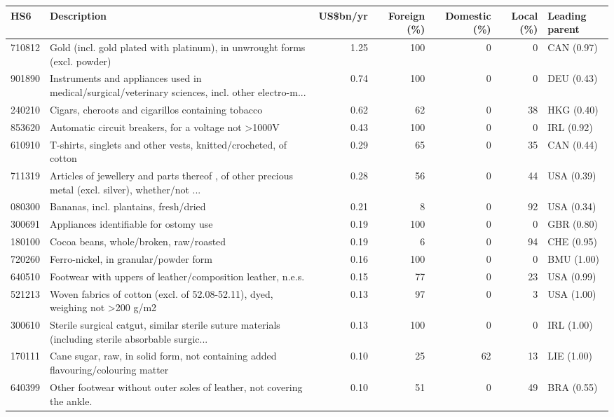 \begin{tabular}{@{}l p{6.4cm} r r r r l@{}}
\toprule
HS6 & Description & US\$bn/yr & Foreign (\%) & Domestic (\%) & Local (\%) & Leading parent \\
\midrule
710812 & Gold (incl. gold plated with platinum), in unwrought forms (excl. powder) & 1.25 & 100 & 0 & 0 & CAN (0.97) \\
901890 & Instruments and appliances used in medical/\allowbreak{}surgical/\allowbreak{}veterinary sciences, incl. other electro-m... & 0.74 & 100 & 0 & 0 & DEU (0.43) \\
240210 & Cigars, cheroots and cigarillos containing tobacco & 0.62 & 62 & 0 & 38 & HKG (0.40) \\
853620 & Automatic circuit breakers, for a voltage not >1000V & 0.43 & 100 & 0 & 0 & IRL (0.92) \\
610910 & T-shirts, singlets and other vests, knitted/\allowbreak{}crocheted, of cotton & 0.29 & 65 & 0 & 35 & CAN (0.44) \\
711319 & Articles of jewellery and parts thereof , of other precious metal (excl. silver), whether/\allowbreak{}not ... & 0.28 & 56 & 0 & 44 & USA (0.39) \\
080300 & Bananas, incl. plantains, fresh/\allowbreak{}dried & 0.21 & 8 & 0 & 92 & USA (0.34) \\
300691 & Appliances identifiable for ostomy use & 0.19 & 100 & 0 & 0 & GBR (0.80) \\
180100 & Cocoa beans, whole/\allowbreak{}broken, raw/\allowbreak{}roasted & 0.19 & 6 & 0 & 94 & CHE (0.95) \\
720260 & Ferro-nickel, in granular/\allowbreak{}powder form & 0.16 & 100 & 0 & 0 & BMU (1.00) \\
640510 & Footwear with uppers of leather/\allowbreak{}composition leather, n.e.s. & 0.15 & 77 & 0 & 23 & USA (0.99) \\
521213 & Woven fabrics of cotton (excl. of 52.08-52.11), dyed, weighing not >200 g/\allowbreak{}m2 & 0.13 & 97 & 0 & 3 & USA (1.00) \\
300610 & Sterile surgical catgut, similar sterile suture materials (including sterile absorbable surgic... & 0.13 & 100 & 0 & 0 & IRL (1.00) \\
170111 & Cane sugar, raw, in solid form, not containing added flavouring/\allowbreak{}colouring matter & 0.10 & 25 & 62 & 13 & LIE (1.00) \\
640399 & Other footwear without  outer soles of  leather, not covering the ankle. & 0.10 & 51 & 0 & 49 & BRA (0.55) \\
\bottomrule
\end{tabular}
